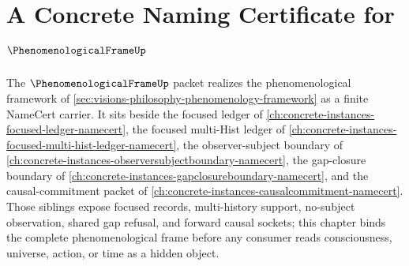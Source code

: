 \chapter{A Concrete Naming Certificate for $\PhenomenologicalFrameUp$}
\label{ch:concrete-instances-phenomenological-frame-namecert}

The $\PhenomenologicalFrameUp$ packet realizes the phenomenological framework of \autoref{sec:visions-philosophy-phenomenology-framework} as a finite NameCert carrier. It sits beside the focused ledger of \autoref{ch:concrete-instances-focused-ledger-namecert}, the focused multi-Hist ledger of \autoref{ch:concrete-instances-focused-multi-hist-ledger-namecert}, the observer-subject boundary of \autoref{ch:concrete-instances-observersubjectboundary-namecert}, the gap-closure boundary of \autoref{ch:concrete-instances-gapclosureboundary-namecert}, and the causal-commitment packet of \autoref{ch:concrete-instances-causalcommitment-namecert}. Those siblings expose focused records, multi-history support, no-subject observation, shared gap refusal, and forward causal sockets; this chapter binds the complete phenomenological frame before any consumer reads consciousness, universe, action, or time as a hidden object.

